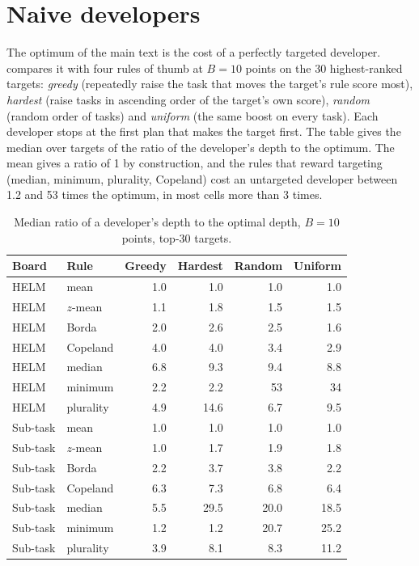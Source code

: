 \section{Naive developers}
\label{app:e5}

The optimum of the main text is the cost of a perfectly targeted developer.  compares it with four rules of thumb at $B=10$ points on the 30 highest-ranked targets: \emph{greedy} (repeatedly raise the task that moves the target's rule score most), \emph{hardest} (raise tasks in ascending order of the target's own score), \emph{random} (random order of tasks) and \emph{uniform} (the same boost on every task). Each developer stops at the first plan that makes the target first. The table gives the median over targets of the ratio of the developer's depth to the optimum. The mean gives a ratio of 1 by construction, and the rules that reward targeting (median, minimum, plurality, Copeland) cost an untargeted developer between 1.2 and 53 times the optimum, in most cells more than 3 times.

\begin{table}[h]
\caption{Median ratio of a developer's depth to the optimal depth, $B=10$ points, top-30 targets.}
\label{tab:e5}
\centering\footnotesize
\begin{tabular}{llrrrr}
\toprule
Board & Rule & Greedy & Hardest & Random & Uniform\\
\midrule
HELM & mean & 1.0 & 1.0 & 1.0 & 1.0\\
HELM & $z$-mean & 1.1 & 1.8 & 1.5 & 1.5\\
HELM & Borda & 2.0 & 2.6 & 2.5 & 1.6\\
HELM & Copeland & 4.0 & 4.0 & 3.4 & 2.9\\
HELM & median & 6.8 & 9.3 & 9.4 & 8.8\\
HELM & minimum & 2.2 & 2.2 & 53 & 34\\
HELM & plurality & 4.9 & 14.6 & 6.7 & 9.5\\
\midrule
Sub-task & mean & 1.0 & 1.0 & 1.0 & 1.0\\
Sub-task & $z$-mean & 1.0 & 1.7 & 1.9 & 1.8\\
Sub-task & Borda & 2.2 & 3.7 & 3.8 & 2.2\\
Sub-task & Copeland & 6.3 & 7.3 & 6.8 & 6.4\\
Sub-task & median & 5.5 & 29.5 & 20.0 & 18.5\\
Sub-task & minimum & 1.2 & 1.2 & 20.7 & 25.2\\
Sub-task & plurality & 3.9 & 8.1 & 8.3 & 11.2\\
\bottomrule
\end{tabular}
\end{table}

